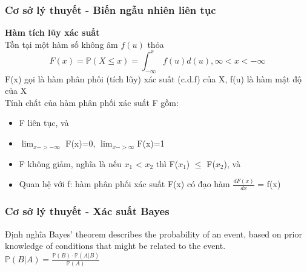 \documentclass{beamer}
\begin{document}
\begin{frame}[t]
\frametitle{Cơ sở lý thuyết - Biến ngẫu nhiên liên tục}
\textbf{Hàm tích lũy xác suất}\\
Tồn tại một hàm số không âm $f(u)$ thỏa
\[
F(x) = \mathbb{P}(X \leq x) = \int_{-\infty}^{x} f(u)d(u), \infty < x < -\infty 
\]
F(x) gọi là hàm phân phối (tích lũy) xác suất (c.d.f) của X, f(u) là hàm mật độ của X\\
Tính chất của hàm phân phối xác suất F gồm:
\begin{itemize}
\item F liên tục, và
\item $\lim_{x->-\infty}$ F(x)=0, $\lim_{x->\infty}$F(x)=1
\item F không giảm, nghĩa là nếu $x_1$ < $x_2$ thì F($x_1$) $\leq$ F($x_2$), và
\item Quan hệ với f: hàm phân phối xác suất F(x) có đạo hàm $\frac{dF(x)}{dx}$ = f(x)     
\end{itemize}
\end{frame}


\begin{frame}[t]
\frametitle{Cơ sở lý thuyết - Xác suất Bayes}
\begin{block}{Định nghĩa}
Bayes’ theorem describes the probability of an event, based on prior knowledge of conditions that might be related to the event.\\
\center
$\mathbb{P}(B|A) = \frac{\mathbb{P}(B) \cdot \mathbb{P}(A|B)}{\mathbb{P}(A)}$
\end{block}
\end{frame}
\end{document}
